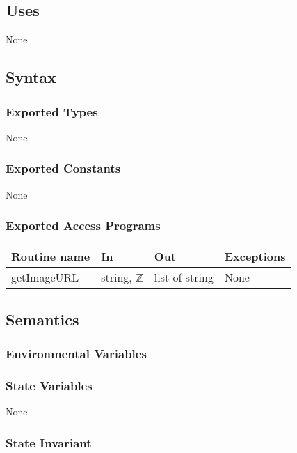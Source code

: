 \documentclass{article}
\begin{document}
\subsection* {Uses}

None

\subsection* {Syntax}

\subsubsection* {Exported Types}

None

\subsubsection* {Exported Constants}

None

\subsubsection* {Exported Access Programs}

\begin{tabular}{| l | l | l | p{5cm} |}
\hline
\textbf{Routine name} & \textbf{In} & \textbf{Out} & \textbf{Exceptions}\\
\hline
getImageURL & string, $\mathbb{Z}$ & list of string & None \\
\hline

\end{tabular}

\subsection* {Semantics}

\subsubsection* {Environmental Variables}



\subsubsection* {State Variables}

None

\subsubsection* {State Invariant}
\end{document}
